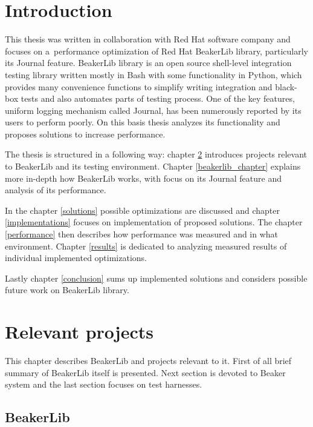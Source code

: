 
\chapter{Introduction}

This thesis was written in collaboration with Red Hat software company and focuses on a~performance optimization of Red Hat BeakerLib library, particularly its Journal feature. BeakerLib library is an open source shell-level integration testing library written mostly in Bash with some functionality in Python, which provides many convenience functions to simplify writing integration and black-box tests and also automates parts of testing process. One of the key features, uniform logging mechanism called Journal, has been numerously reported by its users to perform poorly. On this basis thesis analyzes its functionality and proposes solutions to increase performance.

The thesis is structured in a following way: chapter \ref{relevant_projects} introduces projects relevant to BeakerLib and its testing environment. Chapter \ref{beakerlib_chapter} explains more in-depth how BeakerLib works, with focus on its Journal feature and analysis of its performance. 

In the chapter \ref{solutions} possible optimizations are discussed and chapter \ref{implementations} focuses on implementation of proposed solutions. The chapter \ref{performance} then describes how performance was measured and in what environment. Chapter \ref{results} is dedicated to analyzing measured results of individual implemented optimizations.

Lastly chapter \ref{conclusion} sums up implemented solutions and considers possible future work on BeakerLib library.

\chapter{Relevant projects}
\label{relevant_projects}

This chapter describes BeakerLib and projects relevant to it. First of all brief summary of BeakerLib itself is presented. Next section is devoted to Beaker system and the last section focuses on test harnesses.

\section{BeakerLib}

